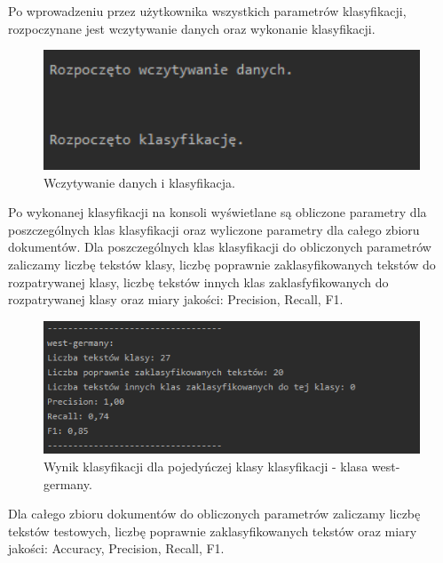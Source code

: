 \documentclass{classrep}
\begin{document}
\newpage
Po wprowadzeniu przez użytkownika wszystkich parametrów klasyfikacji, rozpoczynane jest wczytywanie danych oraz wykonanie klasyfikacji. 
\begin{figure}[h!]
 \centering
 \includegraphics[width=14cm]{srodek.png}
 \vspace{-0.3cm}
 \caption{Wczytywanie danych i klasyfikacja.}
 \label{Wczytywanie danych i klasyfikacja.}
\end{figure}




Po wykonanej klasyfikacji na konsoli wyświetlane są obliczone parametry dla poszczególnych klas klasyfikacji oraz wyliczone parametry dla całego zbioru dokumentów. Dla poszczególnych klas klasyfikacji do obliczonych parametrów zaliczamy liczbę tekstów klasy, liczbę poprawnie zaklasyfikowanych tekstów do rozpatrywanej klasy, liczbę tekstów innych klas zaklasfyfikowanych do rozpatrywanej klasy oraz miary jakości: Precision, Recall, F1. 
\begin{figure}[h!]
 \centering
 \includegraphics[width=14cm]{wynik_dla _klasy.png}
 \vspace{-0.3cm}
 \caption{Wynik klasyfikacji dla pojedyńczej klasy klasyfikacji - klasa west-germany.}
 \label{Wynik klasyfikacji.}
\end{figure}

Dla całego zbioru dokumentów do obliczonych parametrów zaliczamy liczbę tekstów testowych, liczbę poprawnie zaklasyfikowanych tekstów oraz miary jakości: Accuracy, Precision, Recall, F1. 
  
\end{document}

